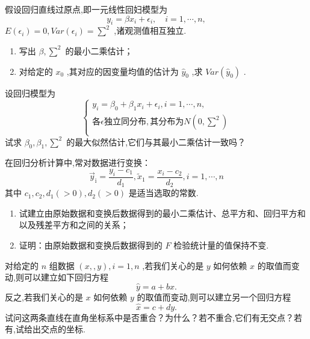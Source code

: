 \begin{xiti}
    \item 假设回归直线过原点,即一元线性回妇模型为 
    \begin{equation}
    y_i=\beta x_i+\epsilon_i,\quad i=1,\cdots ,n,
    \end{equation}
 $E(\epsilon_i)=0,Var(\epsilon_i)=\sum^2$ ,诸观测值相互独立.
    \begin{enumerate}
        \item 写出 $\beta,\sum^2$ 的最小二乘估计；
        \item 对给定的 $x_0$ ,其对应的因变量均值的估计为 $\hat{y}_0$ ,求 $Var(\hat{y}_0)$ .
    \end{enumerate}
    \item 设回归模型为
    \begin{equation}
    \left\{ \begin{array}{l}
    y_i=\beta _0+\beta _1x_i+\epsilon _i,i=1,\cdots ,n,\\
    \text{各}\epsilon\text{独立同分布} ,\text{其分布为}N\left( 0,\sum ^2 \right)\\
    \end{array} \right. 
    \end{equation}
    试求 $\beta_0,\beta_1,\sum^2$ 的最大似然估计,它们与其最小二乘估计一致吗？
    \item 在回归分析计算中,常对数据进行变换：
    \begin{equation}
    \vec{y}_{\mathrm{i}}=\frac{y_{i}-c_{1}}{d_{1}}, \tilde{x}_{1}=\frac{x_{i}-c_{2}}{d_{2}}, i=1, \cdots, n
    \end{equation}
    其中 $c_1,c_2,d_1(>0),d_2(>0)$ 是适当选取的常数.
    \begin{enumerate}
        \item 试建立由原始数据和变换后数据得到的最小二乘估计、总平方和、回归平方和以及残差平方和之间的关系；
        \item 证明：由原始数据和变换后数据得到的 $F$ 检验统计量的值保持不变.
    \end{enumerate}
    \item 对给定的 $n$ 组数据 $(x,,y),i=1,n$ ,若我们关心的是 $y$ 如何依赖 $x$ 的取值而变动,则可以建立如下回归方程\begin{equation}
    \hat{y}=a+bx.
    \end{equation}
    反之,若我们关心的是 $x$ 如何依赖 $y$ 的取值而变动,则可以建立另一个回归方程
    \begin{equation}
    \hat{x}=c+dy.
    \end{equation}
    试问这两条直线在直角坐标系中是否重合？为什么？若不重合,它们有无交点？若有,试给出交点的坐标.

\end{xiti}
